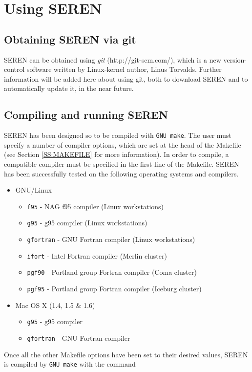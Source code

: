 \documentclass[a4paper]{article}
\newcommand{\NAME}{SEREN }
\newcommand{\var}[1]{\texttt{#1}}
\begin{document}
\section{Using \NAME }


\subsection{Obtaining \NAME via git}
\NAME can be obtained using {\it git} ({\rm http://git-scm.com/}), which is a new version-control software written by Linux-kernel author, Linus Torvalds.   Further information will be added here about using git, both to download \NAME and to automatically update it, in the near future.


\subsection{Compiling and running \NAME}
\NAME has been designed so to be compiled with \var{GNU make}.  
The user must specify a number of compiler options, which are set at the 
head of the Makefile (see Section \ref{SS:MAKEFILE} for more information). 
In order to compile, a compatible compiler must be specified in the 
first line of the Makefile.  
\NAME has been successfully tested on the following operating systems 
and compilers.  
\begin{itemize}
\item GNU/Linux
\begin{itemize}
\item \var{f95}      - NAG f95 compiler (Linux workstations)
\item \var{g95}      - g95 compiler (Linux workstations)
\item \var{gfortran} - GNU Fortran compiler (Linux workstations)
\item \var{ifort}    - Intel Fortran compiler (Merlin cluster)
\item \var{pgf90}    - Portland group Fortran compiler (Coma cluster)
\item \var{pgf95}    - Portland group Fortran compiler (Iceburg cluster)
\end{itemize}
\item Mac OS X (1.4, 1.5 \& 1.6)
\begin{itemize}
\item \var{g95}      - g95 compiler
\item \var{gfortran} - GNU Fortran compiler
\end{itemize}
\end{itemize}
Once all the other Makefile options have been set to their desired values, \NAME is compiled by \var{GNU make} with the command \newline
\end{document}

